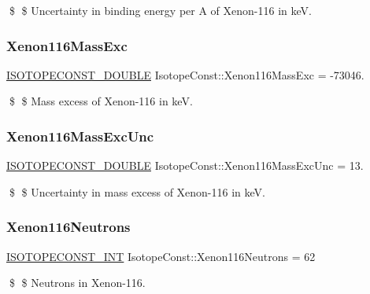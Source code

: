 \$ \$ Uncertainty in binding energy per A of Xenon-\/116 in keV. \mbox{\label{group___isotope_const-_xenon-_xe116_gafb6a31a73d1870954546b646f1a83637}} 
\subsubsection{\texorpdfstring{Xenon116\+Mass\+Exc}{Xenon116MassExc}}
{\footnotesize\ttfamily \mbox{\hyperlink{group___isotope_const-_macros_ga8f45a7272ce02c0b4c65c44636ed719a}{I\+S\+O\+T\+O\+P\+E\+C\+O\+N\+S\+T\+\_\+\+D\+O\+U\+B\+LE}} Isotope\+Const\+::\+Xenon116\+Mass\+Exc = -\/73046.}

\$ \$ Mass excess of Xenon-\/116 in keV. \mbox{\label{group___isotope_const-_xenon-_xe116_gaf8fb20f186f8b944c6c120235861f317}} 
\subsubsection{\texorpdfstring{Xenon116\+Mass\+Exc\+Unc}{Xenon116MassExcUnc}}
{\footnotesize\ttfamily \mbox{\hyperlink{group___isotope_const-_macros_ga8f45a7272ce02c0b4c65c44636ed719a}{I\+S\+O\+T\+O\+P\+E\+C\+O\+N\+S\+T\+\_\+\+D\+O\+U\+B\+LE}} Isotope\+Const\+::\+Xenon116\+Mass\+Exc\+Unc = 13.}

\$ \$ Uncertainty in mass excess of Xenon-\/116 in keV. \mbox{\label{group___isotope_const-_xenon-_xe116_ga47bf9418be111dbcdae58839ea155609}} 
\subsubsection{\texorpdfstring{Xenon116\+Neutrons}{Xenon116Neutrons}}
{\footnotesize\ttfamily \mbox{\hyperlink{group___isotope_const-_macros_ga5f18360b3e99483a35c32d789e62621c}{I\+S\+O\+T\+O\+P\+E\+C\+O\+N\+S\+T\+\_\+\+I\+NT}} Isotope\+Const\+::\+Xenon116\+Neutrons = 62}

\$ \$ Neutrons in Xenon-\/116. \mbox{\label{group___isotope_const-_xenon-_xe116_gab73843a7142de60b76dc067efd469072}} 
